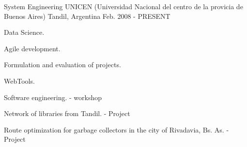 \begin{cventries}
\cventry
{System Engineering} %
{UNICEN (Universidad Nacional del centro de la provicia de Buenos Aires)} %
{Tandil, Argentina} %
{Feb. 2008 - PRESENT} %
{ %
\begin{cvitems}
  \item {Data Science.}
  \item {Agile development.}
  \item {Formulation and evaluation of projects.}
  \item {WebTools.}
  \item {Software engineering. - workshop}
  \item {Network of libraries from Tandil. - Project}
  \item {Route optimization for garbage collectors in the city of Rivadavia, Bs. As. - Project}
\end{cvitems}
}
\end{cventries}
